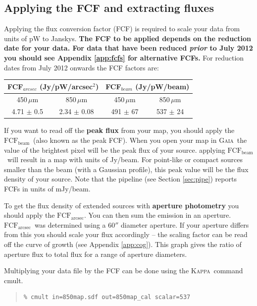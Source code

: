 \documentclass[twoside,11pt]{article}
\newcommand{\xref}[3]{#1}
\newcommand{\xlabel}[1]{}
\renewcommand{\_}{\texttt{\symbol{95}}}
\newenvironment{myquote}{\begin{quote}\begin{small}}{\end{small}\end{quote}}
\newcommand{\fcfb}{$\mathrm{FCF_{beam}}$}
\newcommand{\fcfa}{$\mathrm{FCF_{arcsec}}$}
\newcommand{\Kappa}{\xref{\textsc{Kappa}}{sun95}{}}
\newcommand{\gaia}{\xref{\textsc{Gaia}}{sun214}{}}
\newcommand{\task}[1]{\textsf{#1}}
\newcommand{\cmult}{\xref{\task{cmult}}{sun95}{CMULT}}
\begin{document}
\subsection{\xlabel{apply_fcf}Applying the FCF and extracting fluxes}
\label{sec:cmult}
Applying the flux conversion factor (FCF) is required to scale your data from units of pW to Janskys. \textbf{The FCF to be applied depends on the reduction date for your data. For data that have been reduced \emph{prior} to July 2012 you should see Appendix \ref{app:fcfs} for alternative FCFs.} For reduction dates from July 2012 onwards the FCF factors are:
\begin{table}[h!]
\centering
\begin{tabular}{|c|c|c|c|}
 \hline
 \multicolumn{2}{|c|}{FCF$_{arcsec}$ (Jy/pW/arcsec$^2$) }  & 
\multicolumn{2}{c|}{FCF$_{beam}$ (Jy/pW/beam)}      \\
\hline
\hspace{0.4cm} 450\,$\mu$m \hspace{0.3cm} & 850\,$\mu$m & \hspace{0.4cm} 450\,$\mu$m \hspace{0.3cm}& 850\,$\mu$m \\
 \hline
4.71 $\pm$ 0.5& 2.34 $\pm$ 0.08& 491 $\pm$ 67& 537 $\pm$ 24 \\
\hline
\end{tabular}
\end{table}

If you want to read off the \textbf{peak flux} from your map, you should apply the \fcfb\ (also known as the peak FCF). When you open your map in \gaia\ the value of the brightest pixel will be the peak flux of your source. applying \fcfb\ will result in a map with units of Jy/beam. For point-like or compact sources smaller than the beam (with a Gaussian profile), this peak value will be the flux density of your source. Note that the pipeline (see Section \ref{sec:pipe}) reports FCFs in units of mJy/beam.

To get the flux density of extended sources with \textbf{aperture photometry} you should apply the \fcfa.  You can then sum the emission in an aperture. \fcfa\ was determined using a 60$''$ diameter aperture. If your aperture differs from this you should scale your flux accordingly -- the scaling factor can be read off the curve of growth (see Appendix \ref{app:cog}). This graph gives the ratio of aperture flux to total flux for a range of aperture diameters.

Multiplying your data file by the FCF can be done using the \Kappa\ command \cmult.
\begin{myquote}
\begin{verbatim}
% cmult in=850map.sdf out=850map_cal scalar=537
\end{verbatim}
\end{myquote}
\end{document}
